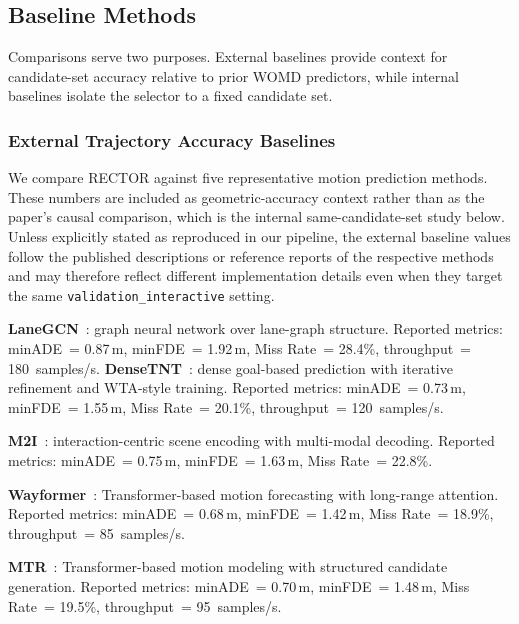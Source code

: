 \subsection{Baseline Methods}
\label{subsec:baseline_methods}

Comparisons serve two purposes. External baselines provide context for candidate-set accuracy relative to prior WOMD predictors, while internal baselines isolate the selector to a fixed candidate set.

\subsubsection{External Trajectory Accuracy Baselines}

We compare RECTOR against five representative motion prediction methods.  These numbers are included as geometric-accuracy context rather than as the paper's causal comparison, which is the internal same-candidate-set study below.  Unless explicitly stated as reproduced in our pipeline, the external baseline values follow the published descriptions or reference reports of the respective methods and may therefore reflect different implementation details even when they target the same \texttt{validation\_interactive} setting.

\textbf{LaneGCN}~\cite{liang2020lanegcn}: graph neural network over lane-graph structure.  Reported metrics: minADE~= 0.87\,m, minFDE~= 1.92\,m, Miss Rate~= 28.4\%, throughput~= 180~samples/s.  \textbf{DenseTNT}~\cite{gu2021densetnt}: dense goal-based prediction with iterative refinement and WTA-style training.  Reported metrics: minADE~= 0.73\,m, minFDE~= 1.55\,m, Miss Rate~= 20.1\%, throughput~= 120~samples/s.

\textbf{M2I}~\cite{Sun_2022}: interaction-centric scene encoding with multi-modal decoding.  Reported metrics: minADE~= 0.75\,m, minFDE~= 1.63\,m, Miss Rate~= 22.8\%.

\textbf{Wayformer}~\cite{nayakanti2023wayformer}: Transformer-based motion forecasting with long-range attention.  Reported metrics: minADE~= 0.68\,m, minFDE~= 1.42\,m, Miss Rate~= 18.9\%, throughput~= 85~samples/s.

\textbf{MTR}~\cite{shi2022motion}: Transformer-based motion modeling with structured candidate generation.  Reported metrics: minADE~= 0.70\,m, minFDE~= 1.48\,m, Miss Rate~= 19.5\%, throughput~= 95~samples/s.

